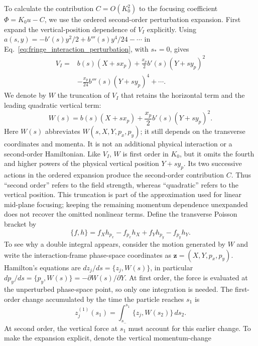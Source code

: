 To calculate the contribution $C=O(K_0^2)$ to the focusing coefficient
$\Phi=K_0u-C$, we use the ordered second-order perturbation expansion.
First expand the vertical-position dependence of $V_I$ explicitly.
Using $a(s,y)=-b'(s)y^2/2+b'''(s)y^4/24-\cdots$ in
Eq.~\eqref{eq:fringe_interaction_perturbation}, with $s_*=0$, gives
\begin{align}
 V_I={}&b(s)(X+s x_p)
       +\frac{x_p}{2}b'(s)(Y+s y_p)^2\nonumber\\
      &-\frac{x_p}{24}b'''(s)(Y+s y_p)^4+\cdots.
\end{align}
We denote by $W$ the truncation of $V_I$ that retains the horizontal term
and the leading quadratic vertical term:
\begin{equation}
 W(s)=b(s)(X+s x_p)+\frac{x_p}{2}b'(s)(Y+s y_p)^2.
 \label{eq:fringe_truncated_perturbation}
\end{equation}
Here $W(s)$ abbreviates $W(s,X,Y,p_x,p_y)$; it still depends on the
transverse coordinates and momenta. It is not an additional physical
interaction or a second-order Hamiltonian. Like $V_I$, $W$ is first order
in $K_0$, but it omits the fourth and higher powers of the physical vertical
position $Y+s y_p$.
Its two successive actions in the ordered expansion produce the
second-order contribution $C$. Thus ``second order'' refers to the field
strength, whereas ``quadratic'' refers to the vertical position.
This truncation is part of the approximation used for linear mid-plane
focusing; keeping the remaining momentum dependence unexpanded does not
recover the omitted nonlinear terms.
Define the transverse Poisson bracket by
\begin{equation}
 \{f,h\}=f_Xh_{p_x}-f_{p_x}h_X+f_Yh_{p_y}-f_{p_y}h_Y.
\end{equation}
To see why a double integral appears, consider the motion generated by
$W$ and write the interaction-frame phase-space coordinates as
$\mathbf z=(X,Y,p_x,p_y)$. Hamilton's equations are
$dz_j/ds=\{z_j,W(s)\}$, in particular
$dp_y/ds=\{p_y,W(s)\}=-\partial W(s)/\partial Y$.
At first order, the force is evaluated at the unperturbed phase-space point,
so only one integration is needed. The first-order change accumulated by
the time the particle reaches $s_1$ is
\begin{equation}
 z_j^{(1)}(s_1)=\int_{s_-}^{s_1}\{z_j,W(s_2)\}\,ds_2.
 \label{eq:fringe_first_order_trajectory}
\end{equation}
At second order, the vertical force at $s_1$ must account for this earlier
change. To make the expansion explicit, denote the vertical momentum-change
